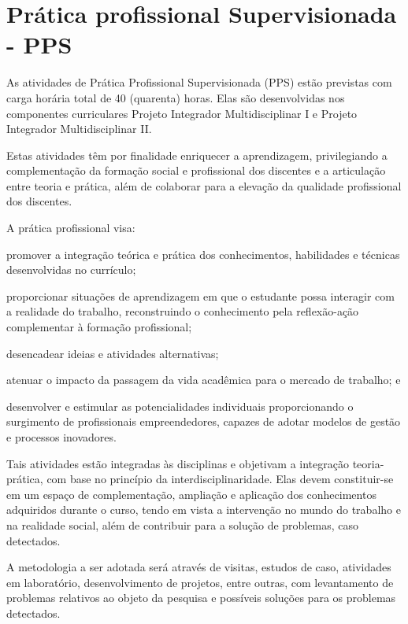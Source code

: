 \documentclass[
	12pt,				%
	openright,			%
	twoside,			%
	a4paper,			%
	chapter=TITLE,		%
	english,			%
	french,				%
	spanish,			%
	brazil,				%
	]{abntex2}
\begin{document}
\chapter{Prática profissional Supervisionada - PPS}
As atividades de Prática Profissional Supervisionada (PPS) estão previstas
com carga horária total de 40 (quarenta) horas. Elas são desenvolvidas nos
componentes curriculares Projeto Integrador Multidisciplinar I e Projeto Integrador
Multidisciplinar II.

Estas atividades têm por finalidade enriquecer a aprendizagem, privilegiando a
complementação da formação social e profissional dos discentes e a articulação
entre teoria e prática, além de colaborar para a elevação da qualidade
profissional dos discentes.

A prática profissional visa:
\begin{alineas}
	\item promover a integração teórica e prática dos conhecimentos, habilidades e
técnicas desenvolvidas no currículo;
	\item proporcionar situações de aprendizagem em que o estudante possa
interagir com a realidade do trabalho, reconstruindo o conhecimento pela
reflexão-ação complementar à formação profissional;
	\item desencadear ideias e atividades alternativas;
	\item atenuar o impacto da passagem da vida acadêmica para o mercado de
trabalho; e
	\item desenvolver e estimular as potencialidades individuais proporcionando o
surgimento de profissionais empreendedores, capazes de adotar modelos
de gestão e processos inovadores. 
	 	
\end{alineas}

Tais atividades estão integradas às disciplinas e objetivam a integração teoria-
prática, com base no princípio da interdisciplinaridade. Elas devem constituir-se em
um espaço de complementação, ampliação e aplicação dos conhecimentos adquiridos
durante o curso, tendo em vista a intervenção no mundo do trabalho e na realidade
social, além de contribuir para a solução de problemas, caso detectados.


A metodologia a ser adotada será através de visitas, estudos de caso,
atividades em laboratório, desenvolvimento de projetos, entre outras, com
levantamento de problemas relativos ao objeto da pesquisa e possíveis soluções para
os problemas detectados.
\end{document}
